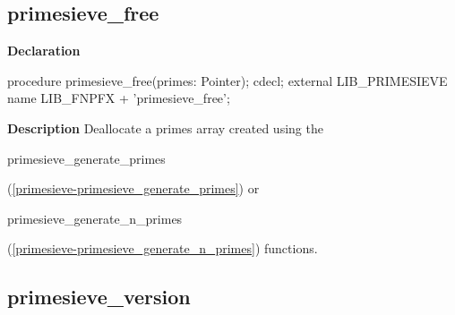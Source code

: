 \documentclass{report}
\newif\ifpdf
\begin{document}
\subsection*{primesieve{\_}free}
\fi
\label{primesieve-primesieve_free}
\begin{list}{}{
\setlength{\itemindent}{0cm}
\setlength{\listparindent}{0cm}
\setlength{\leftmargin}{\evensidemargin}
\addtolength{\leftmargin}{\tmplength}
\settowidth{\labelsep}{X}
\addtolength{\leftmargin}{\labelsep}
\setlength{\labelwidth}{\tmplength}
}
\item[\textbf{Declaration}\hfill]
\ifpdf
\begin{flushleft}
\fi
\begin{ttfamily}
procedure primesieve{\_}free(primes: Pointer); cdecl; external LIB{\_}PRIMESIEVE name LIB{\_}FNPFX + 'primesieve{\_}free';\end{ttfamily}

\ifpdf
\end{flushleft}
\fi

\par
\item[\textbf{Description}]
Deallocate a primes array created using the \begin{ttfamily}primesieve{\_}generate{\_}primes\end{ttfamily}(\ref{primesieve-primesieve_generate_primes}) or \begin{ttfamily}primesieve{\_}generate{\_}n{\_}primes\end{ttfamily}(\ref{primesieve-primesieve_generate_n_primes}) functions.

\end{list}
\ifpdf
\subsection*{\large{\textbf{primesieve{\_}version}}\normalsize\hspace{1ex}\hrulefill}
\else
\end{document}
